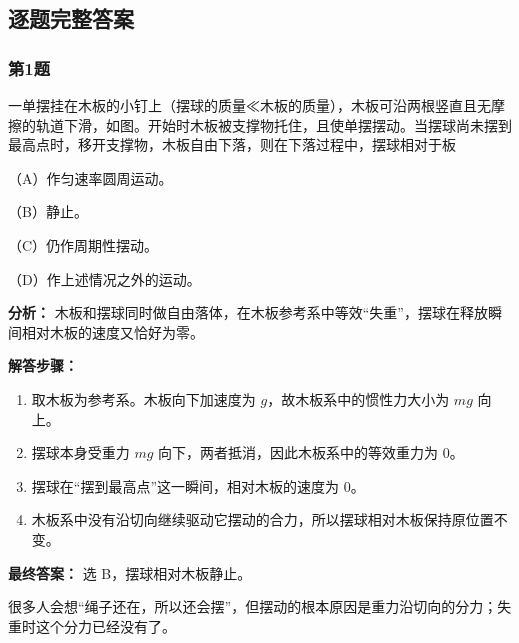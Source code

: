 \documentclass[12pt,a4paper]{ctexart}
\begin{document}
\subsection*{逐题完整答案}
\subsubsection*{第1题}
\begin{tcolorbox}[colback=gray!2!white,colframe=black!60,title={题目}]
一单摆挂在木板的小钉上（摆球的质量≪木板的质量），木板可沿两根竖直且无摩擦的轨道下滑，如图。开始时木板被支撑物托住，且使单摆摆动。当摆球尚未摆到最高点时，移开支撑物，木板自由下落，则在下落过程中，摆球相对于板\par
（A）作匀速率圆周运动。\par
（B）静止。\par
（C）仍作周期性摆动。\par
（D）作上述情况之外的运动。\par
\end{tcolorbox}
\begin{tcolorbox}[colback=blue!2!white,colframe=blue!55!black,title={完整答案}]
\textbf{分析：}
木板和摆球同时做自由落体，在木板参考系中等效“失重”，摆球在释放瞬间相对木板的速度又恰好为零。\par
\textbf{解答步骤：}
\begin{enumerate}
\item 取木板为参考系。木板向下加速度为 \(g\)，故木板系中的惯性力大小为 \(mg\) 向上。
\item 摆球本身受重力 \(mg\) 向下，两者抵消，因此木板系中的等效重力为 0。
\item 摆球在“摆到最高点”这一瞬间，相对木板的速度为 0。
\item 木板系中没有沿切向继续驱动它摆动的合力，所以摆球相对木板保持原位置不变。
\end{enumerate}
\textbf{最终答案：}
选 B，摆球相对木板静止。\par
\end{tcolorbox}
\begin{tcolorbox}[colback=red!2!white,colframe=red!55!black,title={易错点}]
很多人会想“绳子还在，所以还会摆”，但摆动的根本原因是重力沿切向的分力；失重时这个分力已经没有了。\par
\end{tcolorbox}
\end{document}
